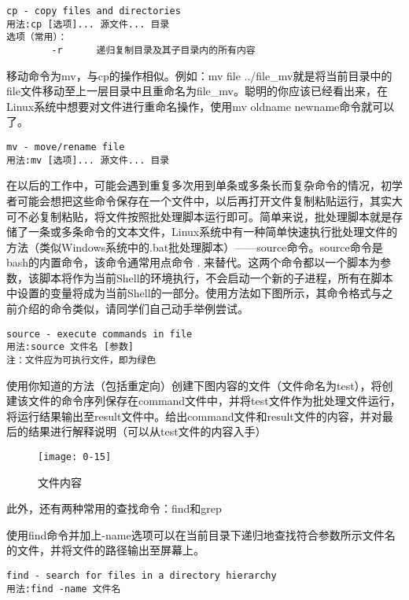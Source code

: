 \begin{verbatim}
cp - copy files and directories
用法:cp [选项]... 源文件... 目录
选项（常用）：
		-r		递归复制目录及其子目录内的所有内容
\end{verbatim}

移动命令为mv，与cp的操作相似。例如：mv file ../file\_mv就是将当前目录中的file文件移动至上一层目录中且重命名为file\_mv。聪明的你应该已经看出来，在Linux系统中想要对文件进行重命名操作，使用mv oldname newname命令就可以了。
\begin{verbatim}
mv - move/rename file
用法:mv [选项]... 源文件... 目录
\end{verbatim}

在以后的工作中，可能会遇到重复多次用到单条或多条长而复杂命令的情况，初学者可能会想把这些命令保存在一个文件中，以后再打开文件复制粘贴运行，其实大可不必复制粘贴，将文件按照批处理脚本运行即可。简单来说，批处理脚本就是存储了一条或多条命令的文本文件，Linux系统中有一种简单快速执行批处理文件的方法（类似Windows系统中的.bat批处理脚本）——source命令。source命令是bash的内置命令，该命令通常用点命令 . 来替代。这两个命令都以一个脚本为参数，该脚本将作为当前Shell的环境执行，不会启动一个新的子进程，所有在脚本中设置的变量将成为当前Shell的一部分。使用方法如下图所示，其命令格式与之前介绍的命令类似，请同学们自己动手举例尝试。

\begin{verbatim}
source - execute commands in file
用法:source 文件名 [参数]
注：文件应为可执行文件，即为绿色
\end{verbatim}

\begin{thinking}\label{think-文件的操作}
使用你知道的方法（包括重定向）创建下图内容的文件（文件命名为test），将创建该文件的命令序列保存在command文件中，并将test文件作为批处理文件运行，将运行结果输出至result文件中。给出command文件和result文件的内容，并对最后的结果进行解释说明（可以从test文件的内容入手）
\end{thinking}
\begin{figure}[htbp]
	\centering
	\texttt{[image: 0-15]}
	\caption{文件内容}\label{fig:0-15}
\end{figure}

此外，还有两种常用的查找命令：find和grep

使用find命令并加上-name选项可以在当前目录下递归地查找符合参数所示文件名的文件，并将文件的路径输出至屏幕上。

\begin{verbatim}
find - search for files in a directory hierarchy
用法:find -name 文件名
\end{verbatim}

